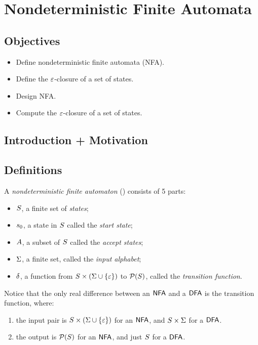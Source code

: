 \chapter{Nondeterministic Finite Automata}

\section{Objectives}

\begin{itemize}
	\item Define nondeterministic finite automata (NFA).
	\item Define the $\varepsilon$-closure of a set of states.
	\item Design NFA.
	\item Compute the $\varepsilon$-closure of a set of states.
\end{itemize}

\section{Introduction + Motivation}

\section{Definitions}

A \textit{nondeterministic finite automaton} (\NFA) consists of 5 parts:
\begin{itemize}
	\item $S$, a finite set of \textit{states};
	\item $s_0$, a state in $S$ called the \textit{start state};
	\item $A$, a subset of $S$ called the \textit{accept states};
	\item $\Sigma$, a finite set, called the \textit{input alphabet};
	\item $\delta$, a function from $S \times \left(\Sigma \cup \{\varepsilon\}\right)$ to $\mathcal{P}(S)$, called the \textit{transition function}.
\end{itemize}

Notice that the only real difference between an $\textsf{NFA}$ and a $\textsf{DFA}$ is the transition function, where:
\begin{enumerate}
	\item the input pair is $S \times \left(\Sigma \cup \{\varepsilon\}\right)$ for an $\textsf{NFA}$, and $S \times \Sigma$ for a $\textsf{DFA}$.
	\item the output is $\mathcal{P}(S)$ for an $\textsf{NFA}$, and just $S$ for a $\textsf{DFA}$.
\end{enumerate}

